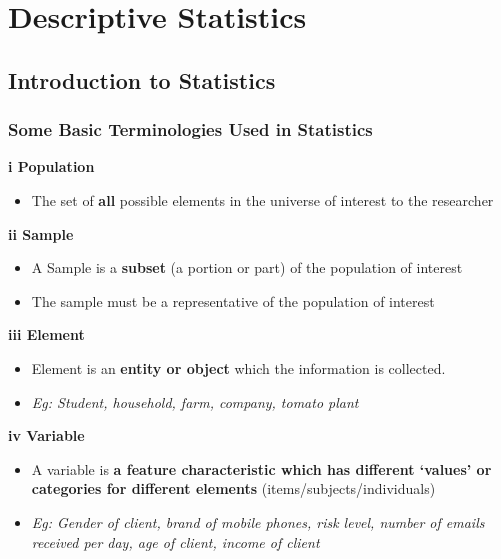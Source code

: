 \documentclass[]{book}
\providecommand{\tightlist}{%
  \setlength{\itemsep}{0pt}\setlength{\parskip}{0pt}}
\begin{document}
\hypertarget{descriptive-statistics}{%
\chapter{Descriptive Statistics}\label{descriptive-statistics}}


\hypertarget{introduction-to-statistics}{%
\section{Introduction to Statistics}\label{introduction-to-statistics}}

\hypertarget{some-basic-terminologies-used-in-statistics}{%
\subsection{Some Basic Terminologies Used in Statistics}\label{some-basic-terminologies-used-in-statistics}}

\textbf{i Population}

\begin{itemize}
\tightlist
\item
  The set of \textbf{all} possible elements in the universe of interest to the researcher
\end{itemize}

\textbf{ii Sample}

\begin{itemize}
\tightlist
\item
  A Sample is a \textbf{subset} (a portion or part) of the population of interest
\item
  The sample must be a representative of the population of interest
\end{itemize}

\textbf{iii Element}

\begin{itemize}
\tightlist
\item
  Element is an \textbf{entity or object} which the information is collected.
\item
  \emph{Eg: Student, household, farm, company, tomato plant}
\end{itemize}

\textbf{iv Variable}

\begin{itemize}
\tightlist
\item
  A variable is \textbf{a feature characteristic which has different `values' or categories for different elements} (items/subjects/individuals)
\item
  \emph{Eg: Gender of client, brand of mobile phones, risk level, number of emails received per day, age of client, income of client}
\end{itemize}
\end{document}
